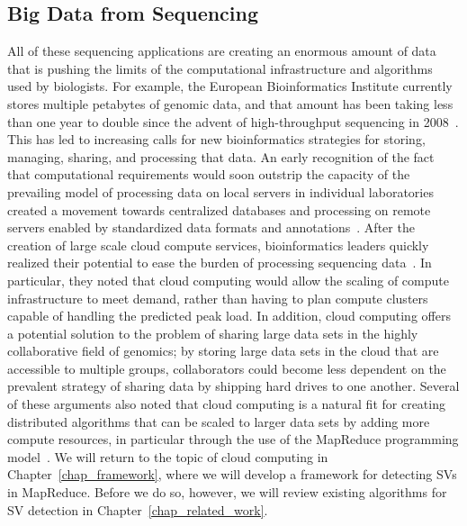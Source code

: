 \subsection{Big Data from Sequencing}\label{section_seq_big_data}

All of these sequencing applications are creating an enormous amount of data that is pushing the limits of the computational infrastructure and algorithms used by biologists. For example, the European Bioinformatics Institute currently stores multiple petabytes of genomic data, and that amount has been taking less than one year to double since the advent of high-throughput sequencing in 2008~\cite{Marx:2013dz}. This has led to increasing calls for new bioinformatics strategies for storing, managing, sharing, and processing that data. An early recognition of the fact that computational requirements would soon outstrip the capacity of the prevailing model of processing data on local servers in individual laboratories created a movement towards centralized databases and processing on remote servers enabled by standardized data formats and annotations~\cite{Stein:2008gh}. After the creation of large scale cloud compute services, bioinformatics leaders quickly realized their potential to ease the burden of processing sequencing data~\cite{Stein:2010gp,Schatz:2010js,Schadt:2010dp}. In particular, they noted that cloud computing would allow the scaling of compute infrastructure to meet demand, rather than having to plan compute clusters capable of handling the predicted peak load. In addition, cloud computing offers a potential solution to the problem of sharing large data sets in the highly collaborative field of genomics; by storing large data sets in the cloud that are accessible to multiple groups, collaborators could become less dependent on the prevalent strategy of sharing data by shipping hard drives to one another. Several of these arguments also noted that cloud computing is a natural fit for creating distributed algorithms that can be scaled to larger data sets by adding more compute resources, in particular through the use of the MapReduce programming model~\cite{Schatz:2010js,Schadt:2010dp}. We will return to the topic of cloud computing in Chapter~\ref{chap_framework}, where we will develop a framework for detecting SVs in MapReduce. Before we do so, however, we will review existing algorithms for SV detection in Chapter~\ref{chap_related_work}.
